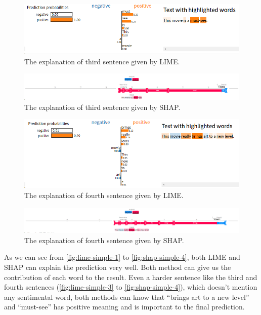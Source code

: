 \documentclass{article}[12pt]
\begin{document}
\begin{figure}[htbp]
	\centering
	\includegraphics[width=\linewidth]{figure/lime-simple-3}
	\caption{The explanation of third sentence given by LIME.}
	\label{fig:lime-simple-3}
\end{figure}

\begin{figure}[htbp]
	\centering
	\includegraphics[width=\linewidth]{figure/shap-simple-3}
	\caption{The explanation of third sentence given by SHAP.}
	\label{fig:shap-simple-3}
\end{figure}

\begin{figure}[htbp]
	\centering
	\includegraphics[width=\linewidth]{figure/lime-simple-4}
	\caption{The explanation of fourth sentence given by LIME.}
	\label{fig:lime-simple-4}
\end{figure}

\begin{figure}[htbp]
	\centering
	\includegraphics[width=\linewidth]{figure/shap-simple-4}
	\caption{The explanation of fourth sentence given by SHAP.}
	\label{fig:shap-simple-4}
\end{figure}

As we can see from \autoref{fig:lime-simple-1} to \autoref{fig:shap-simple-4}, both LIME and SHAP can explain the prediction very well. Both method can give us the contribution of each word to the result. Even a harder sentence like the third and fourth sentences (\autoref{fig:lime-simple-3} to \autoref{fig:shap-simple-4}), which doesn't mention any sentimental word, both methods can know that ``brings art to a new level'' and ``must-see'' has positive meaning and is important to the final prediction.
\end{document}
